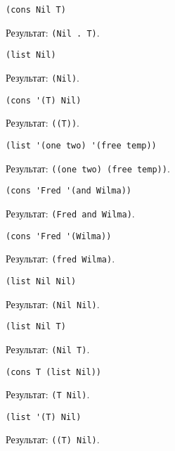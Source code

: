 \begin{lstlisting}
(cons Nil T)
\end{lstlisting}
Результат: \texttt{(Nil . T)}.
\vspace{10mm}


\begin{lstlisting}
(list Nil)
\end{lstlisting}
Результат: \texttt{(Nil)}.
\vspace{10mm}

\begin{lstlisting}
(cons '(T) Nil)
\end{lstlisting}
Результат: \texttt{((T))}.
\vspace{10mm}


\begin{lstlisting}
(list '(one two) '(free temp))
\end{lstlisting}
Результат: \texttt{((one two) (free temp))}.
\vspace{10mm}

\begin{lstlisting}
(cons 'Fred '(and Wilma))
\end{lstlisting}
Результат: \texttt{(Fred and Wilma)}.
\vspace{10mm}


\begin{lstlisting}
(cons 'Fred '(Wilma))
\end{lstlisting}
Результат: \texttt{(fred Wilma)}.
\vspace{10mm}

\begin{lstlisting}
(list Nil Nil)
\end{lstlisting}
Результат: \texttt{(Nil Nil)}.
\vspace{10mm}


\begin{lstlisting}
(list Nil T)
\end{lstlisting}
Результат: \texttt{(Nil T)}.
\vspace{10mm}

\begin{lstlisting}
(cons T (list Nil))
\end{lstlisting}
Результат: \texttt{(T Nil)}.
\vspace{10mm}

\begin{lstlisting}
(list '(T) Nil)
\end{lstlisting}
Результат: \texttt{((T) Nil)}.
\vspace{10mm}

